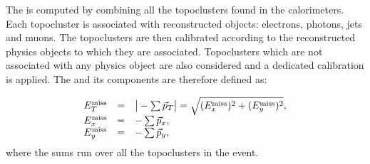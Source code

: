 The \met{} is computed by combining all the topoclusters found in the
calorimeters. Each topocluster is associated with reconstructed
objects: electrons, photons, jets and muons. The topoclusters are then
calibrated according to the reconstructed physics objects to which
they are associated. Topoclusters which are not associated with any
physics object are also considered and a dedicated calibration is
applied. 
The \met{} and its components are therefore defined as:

\begin{equation}\label{eq:met}
\begin{array}{lcl}
E^{\rm miss}_{T} & = & \big|-\sum\vec{p}_T \big| = \sqrt{(E^{\rm miss}_{x})^2 + (E^{\rm miss}_{y})^2} ,\\
E^{\rm miss}_{x} & = & -\sum\vec{p}_x ,\\
E^{\rm miss}_{y} & = & -\sum\vec{p}_y ,\\
\end{array}	\end{equation}
where the sums run over all the topoclusters in the event.
